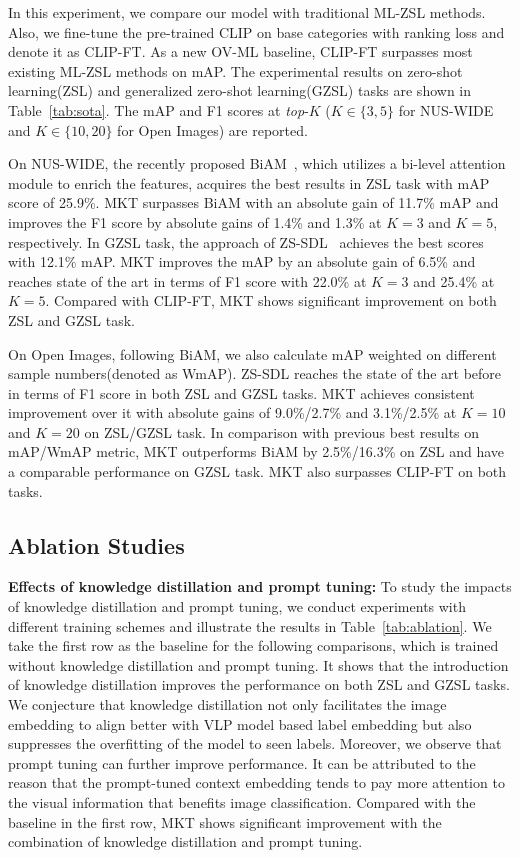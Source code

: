 \documentclass[letterpaper]{article} %
\begin{document}
In this experiment, we compare our model with traditional ML-ZSL methods.
Also, we fine-tune the pre-trained CLIP on base categories with ranking loss and denote it as CLIP-FT.
As a new OV-ML baseline, CLIP-FT surpasses most existing ML-ZSL methods on mAP.
The experimental results on zero-shot learning(ZSL) and generalized zero-shot learning(GZSL) tasks are shown in Table~\ref{tab:sota}.
The mAP and F1 scores at \textit{top}-$K$ ($K\in\{3,5\}$ for NUS-WIDE and
$K\in\{10,20\}$ for Open Images) are reported.

On NUS-WIDE, the recently proposed BiAM~\cite{biam}, which utilizes a bi-level attention module to enrich the features, acquires the best results in ZSL task with mAP score of 25.9\%.
MKT surpasses BiAM with an absolute gain of 11.7\% mAP and improves the F1 score by absolute gains of 1.4\% and 1.3\% at $K {=} 3$ and $K {=} 5$, respectively.
In GZSL task, the approach of ZS-SDL~\cite{zssdl} achieves the best scores with 12.1\% mAP.
MKT improves the mAP by an absolute gain of 6.5\% and reaches state of the art in terms of F1 score with 22.0\% at $K {=} 3$ and 25.4\% at $K {=} 5$.
Compared with CLIP-FT, MKT shows significant improvement on both ZSL and GZSL task.

On Open Images, following BiAM, we also calculate mAP weighted on different sample numbers(denoted as WmAP).
ZS-SDL reaches the state of the art before in terms of F1 score in both ZSL and GZSL tasks.
MKT achieves consistent improvement over it with absolute gains of 9.0\%/2.7\% and 3.1\%/2.5\% at $K {=} 10$ and $K {=} 20$ on ZSL/GZSL task.
In comparison with previous best results on mAP/WmAP metric, MKT outperforms BiAM by 2.5\%/16.3\% on ZSL and have a comparable performance on GZSL task.
MKT also surpasses CLIP-FT on both tasks.





\subsection{Ablation Studies}
\noindent\textbf{Effects of knowledge distillation and prompt tuning:}
To study the impacts of knowledge distillation and prompt tuning,
we conduct experiments with different training schemes and illustrate the results in Table~\ref{tab:ablation}.
We take the first row as the baseline for the following comparisons, which is trained without knowledge distillation and prompt tuning.
It shows that the introduction of knowledge distillation improves the performance on both ZSL and GZSL tasks.
We conjecture that knowledge distillation not only facilitates the image embedding to align better with VLP model based label embedding but also suppresses the overfitting of the model to seen labels.
Moreover, we observe that prompt tuning can further improve performance.
It can be attributed to the reason that the prompt-tuned context embedding tends to pay more attention to the visual information that benefits image classification.
Compared with the baseline in the first row, MKT shows significant improvement with the combination of knowledge distillation and prompt tuning.
\end{document}
